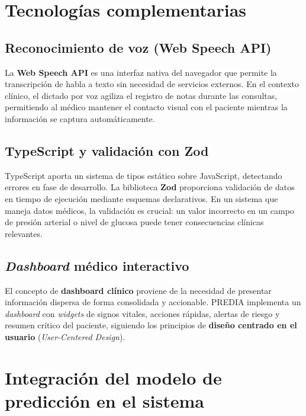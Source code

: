 \documentclass[12pt, letterpaper, twoside]{report}
\begin{document}
\section{Tecnologías complementarias}

\subsection{Reconocimiento de voz (Web Speech API)}

La \textbf{Web Speech API} es una interfaz nativa del navegador que permite la transcripción de habla a texto sin necesidad de servicios externos. En el contexto clínico, el dictado por voz agiliza el registro de notas durante las consultas, permitiendo al médico mantener el contacto visual con el paciente mientras la información se captura automáticamente.

\subsection{TypeScript y validación con Zod}

TypeScript aporta un sistema de tipos estático sobre JavaScript, detectando errores en fase de desarrollo. La biblioteca \textbf{Zod} proporciona validación de datos en tiempo de ejecución mediante esquemas declarativos. En un sistema que maneja datos médicos, la validación es crucial: un valor incorrecto en un campo de presión arterial o nivel de glucosa puede tener consecuencias clínicas relevantes.

\subsection{\textit{Dashboard} médico interactivo}

El concepto de \textbf{dashboard clínico} proviene de la necesidad de presentar información dispersa de forma consolidada y accionable. PREDIA implementa un \textit{dashboard} con \textit{widgets} de signos vitales, acciones rápidas, alertas de riesgo y resumen crítico del paciente, siguiendo los principios de \textbf{diseño centrado en el usuario} (\textit{User-Centered Design}).

\section{Integración del modelo de predicción en el sistema}
\end{document}
